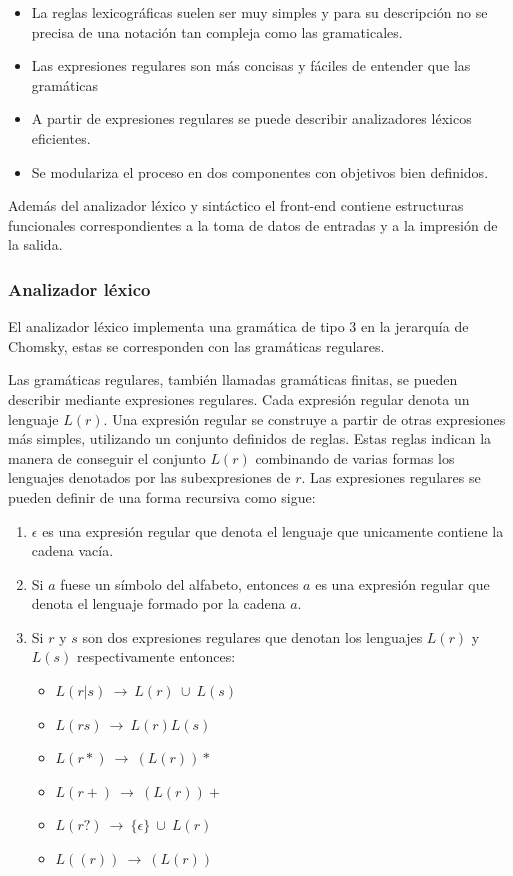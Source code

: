 \begin{itemize}
\item La reglas lexicográficas suelen ser muy simples y para su descripción no se precisa de una 
notación tan compleja como las gramaticales.
\item Las expresiones regulares son más concisas y fáciles de entender que las gramáticas
\item A partir de expresiones regulares se puede describir analizadores léxicos eficientes.
\item Se modulariza el proceso en dos componentes con objetivos bien definidos. 
\end{itemize}

Además del analizador léxico y sintáctico el front-end contiene estructuras funcionales correspondientes
a la toma de datos de entradas y a la impresión de la salida. 

\subsubsection {Analizador léxico}
El analizador léxico implementa una gramática de tipo 3 en la jerarquía de Chomsky, estas
se corresponden con las gramáticas regulares. 

Las gramáticas regulares, también llamadas gramáticas finitas, se pueden describir mediante expresiones regulares. 
Cada expresión regular denota un lenguaje $L(r)$. Una expresión regular se construye a partir de otras expresiones
más simples, utilizando un conjunto definidos de reglas. Estas reglas indican la manera de conseguir el conjunto 
$L(r)$ combinando de varias formas los lenguajes denotados por las subexpresiones de $r$. Las expresiones regulares
se pueden definir de una forma recursiva como sigue: 

\begin {enumerate}
\item $\epsilon$ es una expresión regular que denota el lenguaje que unicamente contiene la cadena vacía.
\item Si $a$ fuese un símbolo del alfabeto, entonces $a$ es una expresión regular que denota el lenguaje formado
por la cadena $a$.
\item Si $r$ y $s$ son dos expresiones regulares que denotan los lenguajes $L(r)$ y $L(s)$ respectivamente entonces:
\begin{itemize}
   \item $L(r|s)\ \rightarrow\ L(r)\ \cup\ L(s)$
   \item $L(rs) \ \rightarrow\ L(r)L(s)$
   \item $L(r*)\ \rightarrow\ (L(r))*$
   \item $L(r+)\ \rightarrow\ (L(r))+$
   \item $L(r?)\ \rightarrow\ \{\epsilon\}\ \cup\ L(r)$
   \item $L((r))\ \rightarrow\ (L(r))$
\end{itemize}
\end{enumerate}

